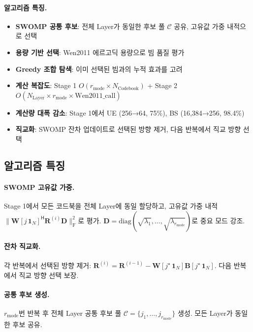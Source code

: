 \documentclass[10pt]{article}
\begin{document}
\paragraph{알고리즘 특징.}
\begin{itemize}
    \item \textbf{SWOMP 공통 후보}: 전체 Layer가 동일한 후보 풀 $\mathcal{C}$ 공유, 고유값 가중 내적으로 선택
    \item \textbf{용량 기반 선택}: Wen2011 에르고딕 용량으로 빔 품질 평가
    \item \textbf{Greedy 조합 탐색}: 이미 선택된 빔과의 누적 효과를 고려
    \item \textbf{계산 복잡도}: Stage 1 $O(r_{\text{mode}} \times N_{\text{Codebook}})$ + Stage 2 $O(N_{\text{Layer}} \times r_{\text{mode}} \times \text{Wen2011\_call})$
    \item \textbf{계산량 대폭 감소}: Stage 1에서 UE (256→64, 75\%), BS (16,384→256, 98.4\%)
    \item \textbf{직교화}: SWOMP 잔차 업데이트로 선택된 방향 제거, 다음 반복에서 직교 방향 선택
\end{itemize}

\subsection{알고리즘 특징}

\paragraph{SWOMP 고유값 가중.}
Stage 1에서 모든 코드북을 전체 Layer에 동일 할당하고, 고유값 가중 내적 $\|\mathbf{W}[j\,\mathbf{1}_N]^{\mathsf{H}} \mathbf{R}^{(i)} \mathbf{D}\|_{\text{F}}^2$로 평가. $\mathbf{D} = \text{diag}(\sqrt{\lambda_1}, \ldots, \sqrt{\lambda_{r_{\text{mode}}}})$로 중요 모드 강조.

\paragraph{잔차 직교화.}
각 반복에서 선택된 방향 제거: $\mathbf{R}^{(i)} = \mathbf{R}^{(i-1)} - \mathbf{W}[j^{\star}\,\mathbf{1}_N] \mathbf{B}[j^{\star}\,\mathbf{1}_N]$. 다음 반복에서 직교 방향 선택 보장.

\paragraph{공통 후보 생성.}
$r_{\text{mode}}$번 반복 후 전체 Layer 공통 후보 풀 $\mathcal{C} = \{j_1, \ldots, j_{r_{\text{mode}}}\}$ 생성. 모든 Layer가 동일한 후보 공유.
\end{document}
